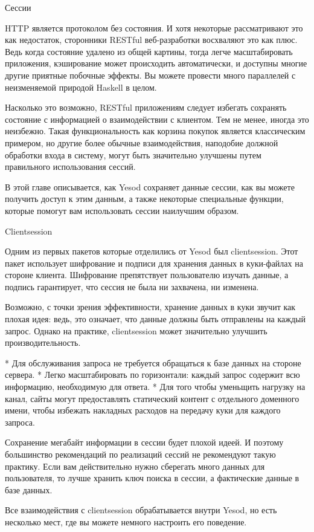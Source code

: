 Сессии

HTTP является протоколом без состояния. И хотя некоторые рассматривают это как недостаток, сторонники RESTful веб-разработки восхваляют это как плюс. Ведь когда состояние удалено из общей картины, тогда легче масштабировать приложения, кэширование может происходить автоматически, и доступны многие другие приятные побочные эффекты. Вы можете провести много параллелей с неизменяемой природой Haskell в целом.

Насколько это возможно, RESTful приложениям следует избегать сохранять состояние с информацией о взаимодействии с клиентом. Тем не менее, иногда это неизбежно. Такая функциональность как корзина покупок является классическим примером, но другие более обычные взаимодействия, наподобие должной обработки входа в систему, могут быть значительно улучшены путем правильного использования сессий.

В этой главе описывается, как Yesod сохраняет данные сессии, как вы можете получить доступ к этим данным, а также некоторые специальные функции, которые помогут вам использовать сессии наилучшим образом.

Clientsession

Одним из первых пакетов которые отделились от Yesod был clientsession. Этот пакет использует шифрование и подписи для хранения данных в куки-файлах на стороне клиента. Шифрование препятствует пользователю изучать данные, а подпись гарантирует, что сессия не была ни захвачена, ни изменена.

Возможно, с точки зрения эффективности, хранение данных в куки звучит как плохая идея: ведь, это означает, что данные должны быть отправлены на каждый запрос. Однако на практике, clientsession может значительно улучшить производительность.

* Для обслуживания запроса не требуется обращаться к базе данных на стороне сервера.
* Легко масштабировать по горизонтали: каждый запрос содержит всю информацию, необходимую для ответа.
* Для того чтобы уменьщить нагрузку на канал, сайты могут предоставлять статический контент с отдельного доменного имени, чтобы избежать накладных расходов на передачу куки для каждого запроса.

Сохранение мегабайт информации в сессии будет плохой идеей. И поэтому большинство рекомендаций по реализаций сессий не рекомендуют такую практику. Если вам действительно нужно сберегать много данных для пользователя, то лучше хранить ключ поиска в сессии, а фактические данные в базе данных.

Все взаимодействия с clientsession обрабатывается внутри Yesod, но есть несколько мест, где вы можете немного настроить его поведение.

